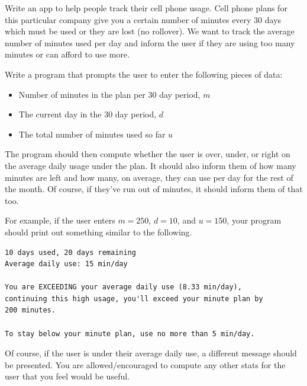 \begin{exer}
Write an app to help people track their cell phone usage.  Cell 
phone plans for this particular company give you a certain number of minutes
every 30 days which must be used or they are lost (no rollover).  We want
to track the average number of minutes used per day and inform the user
if they are using too many minutes or can afford to use more.

Write a program that prompts the user to enter the following pieces of data:
\begin{itemize}
  \item Number of minutes in the plan per 30 day period, $m$
  \item The current day in the 30 day period, $d$
  \item The total number of minutes used so far $u$
\end{itemize}
The program should then compute whether the user is over, under, or 
right on the average daily usage under the plan.  It should also inform
them of how many minutes are left and how many, on average, they can
use per day for the rest of the month.  Of course, if they've run out of minutes, it
should inform them of that too.

For example, if the user enters $m = 250$, $d = 10$, and $u = 150$, your
program should print out something similar to the following.

\begin{verbatim}
10 days used, 20 days remaining
Average daily use: 15 min/day

You are EXCEEDING your average daily use (8.33 min/day), 
continuing this high usage, you'll exceed your minute plan by
200 minutes.

To stay below your minute plan, use no more than 5 min/day.
\end{verbatim}

Of course, if the user is under their average daily use, a different
message should be presented.  You are allowed/encouraged to 
compute any other stats for the user that you feel would be useful.
\end{exer}

